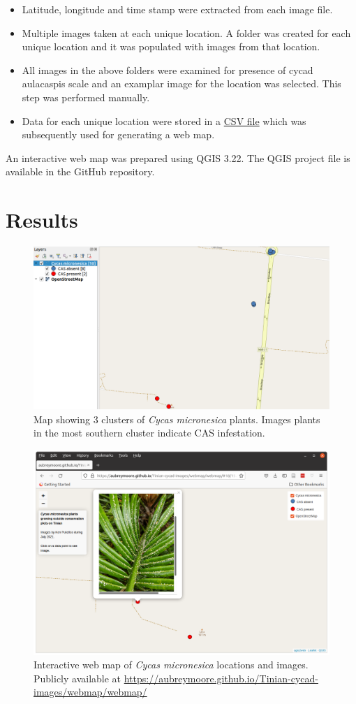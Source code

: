 \documentclass[12pt,letterpaper,english,bibliography=totocnumbered, abstract=on]{scrartcl}
\begin{document}
\begin{itemize}
	\item Latitude, longitude and time stamp were extracted from each image file. \item Multiple images taken at each unique location. A folder was created for each unique location and it was populated with images from that location.
	\item All images in the above folders were examined for presence of cycad aulacaspis scale and an examplar image for the location was selected. This step was performed manually.
	\item Data for each unique location were stored in a \href{https://github.com/aubreymoore/Tinian-cycad-images/blob/main/images.csv}{CSV file} which was subsequently used for generating a web map.
\end{itemize}

An interactive web map was prepared using QGIS 3.22. The QGIS project file is available in the GitHub repository.

\clearpage
\section{Results}

\begin{figure}[h]
	\centering
	\includegraphics[width=1\linewidth]{"Screenshot from 2022-03-24 09-21-42"}
	\caption{Map showing 3 clusters of \textit{Cycas micronesica} plants. Images plants in the most southern cluster indicate CAS infestation.}
	\label{fig:screenshot-from-2022-03-24-09-21-42}
\end{figure}

\begin{figure}[h]
	\centering
	\includegraphics[width=1\linewidth]{webmap}
	\caption{Interactive web map of \textit{Cycas micronesica} locations and images.
	Publicly available at \url{https://aubreymoore.github.io/Tinian-cycad-images/webmap/webmap/}}
	\label{fig:webmap}
\end{figure}
\end{document}
